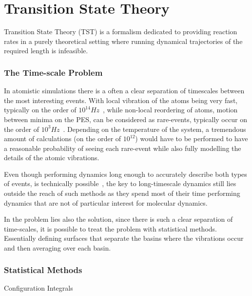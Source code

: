 \section{Transition State Theory}
\label{sec:tst}

Transition State Theory (TST) is a formalism dedicated to providing reaction rates in a purely theoretical setting where running dynamical trajectories of the required length is infeasible.

\recent

\incomplete

\subsubsection{The Time-scale Problem}
In atomistic simulations there is a often a clear separation of timescales between the most interesting events.
With local vibration of the atoms being very fast, typically on the order of $10^14 \unit{Hz}$~\citemiss,
while non-local reordering of atoms, motion between minima on the PES, can be considered as rare-events, typically occur on the order of $10^3 \unit{Hz}$~\citemiss.
Depending on the temperature of the system, a tremendous amount of calculations (on the order of $10^12$) would have to be performed to have a reasonable probability of seeing each rare-event while also fully modelling the details of the atomic vibrations.

Even though performing dynamics long enough to accurately describe both types of events, is technically possible~\citemiss, the key to long-timescale dynamics still lies outside the reach of such methods as they spend most of their time performing dynamics that are not of particular interest for molecular dynamics.

In the problem lies also the solution, since there is such a clear separation of time-scales, it is possible to treat the problem with statistical methods.
Essentially defining surfaces that separate the basins where the vibrations occur and then averaging over each basin.

\subsubsection{Statistical Methods}

\bit
\item Configuration Integrals
\eit

